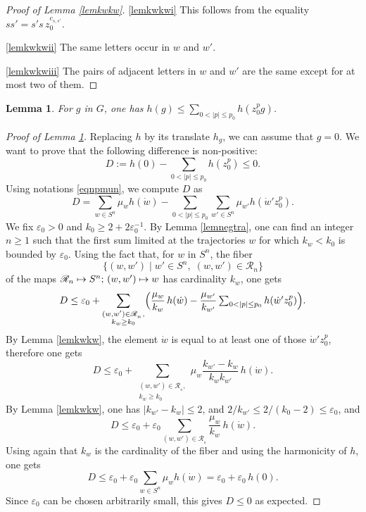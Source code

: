 \documentclass[11pt]{article}
\newcommand{\skpt}{\smallskip}
\numberwithin{equation}{section}
\let\mathcal\mathscr
\def\mto{\mathchoice{\longmapsto}{\mapsto}{\mapsto}{\mapsto}}
\newtheorem{Lem}[Thm]{Lemma}
\theoremstyle{definition}
\newcommand{\mc}[1]{\mathcal{ #1}}
\let\eps\varepsilon
\begin{document}
\skpt
\begin{proof}[Proof of Lemma \ref{lemkwkw}]
\eqref{lemkwkwi} This follows from the equality $ss'=s's\, z_0^{c_{s,s'}}$.

\eqref{lemkwkwii} The same letters occur in $w$ and $w'$.

\eqref{lemkwkwiii} The pairs of adjacent letters in $w$ and $w'$ are the same except for at most two of them.
\end{proof}

\begin{Lem}
\label{lemhghgzp}
For $g$ in $G$, one has $h(g)\leq \sum_{0<|p|\leq p_0}h(z_0^pg)$.
\end{Lem}

\begin{proof}[Proof of Lemma \ref{lemhghgzp}]
Replacing $h$ by its translate $h_g$, we can assume that $g=0$.
We want to prove that the following difference is non-positive:
\[
D:=
h(0)- \sum_{0<|p|\leq p_0}h(z_0^p) \leq 0.
\]
Using notations \eqref{eqnpmun}, we compute $D$ as
\[
D=
\sum_{w\in S^n}\mu_wh(\dot{w})-
\sum_{0<|p|\leq p_0}\sum_{w'\in S^n}\mu_{w'}h(\dot{w}'z_0^p).
\]
We fix $\eps_0>0$ and $k_0\geq 2+2\eps_0^{-1}$.
By Lemma \ref{lemnegtra}, one can find an integer $n\geq 1$
such that
the first sum limited at the trajectories $w$ for which $k_w<k_0$ is bounded by $\eps_0$. Using the fact that, for $w$ in $S^n$, the fiber
\[
\{(w,w')\mid w'\in S^n,\; (w,w')\in \mc R_n\}
\]
of the maps
$\mc R_n\mto S^n;\,(w,w')\mto w$ has cardinality $k_w$, one gets
\[
D\leq
\eps_0+
\sum_{\substack{(w,w')\in \mc R_{_n},\\ k_w\geq k_0}}
\Bigl(\frac{\mu_w}{k_w}\,h(\dot{w})-
\frac{\mu_{w'}}{k_{w'}}
\textstyle\sum_{0<|p|\leq p_0}h(\dot{w}'z_0^p)\Bigr).
\]
By Lemma \ref{lemkwkw}, the element $\dot{w}$ is equal
to at least one of those $\dot{w}'z_0^p$, therefore one gets
\[
D\leq
\eps_0+
\sum_{\substack{(w,w')\in \mc R_{_n},\\ k_w\geq k_0}}
\mu_w\frac{k_{w'}-k_w}{k_wk_{w'}}\,h(\dot{w}).
\]
By Lemma \ref{lemkwkw}, one has $|k_{w'}\!-\!k_w|\leq 2$,
and $2/k_{w'}\leq 2/(k_0\!-\!2)\leq \eps_0$, and
\[
D\leq
\eps_0+
\eps_0
\sum_{(w,w')\in \mc R_{_n}}
\frac{\mu_w}{k_w}\,h(\dot{w}).
\]
Using again that $k_w$ is the cardinality of the fiber and using the harmonicity of $h$,
one gets
\[
D\leq
\eps_0+
\eps_0
\sum_{w\in S^n}
\mu_w h(\dot{w})
=
\eps_0+
\eps_0\, h(0).
\]
Since $\eps_0$ can be chosen arbitrarily small, this gives $D\leq 0$ as expected.
\end{proof}
\end{document}
